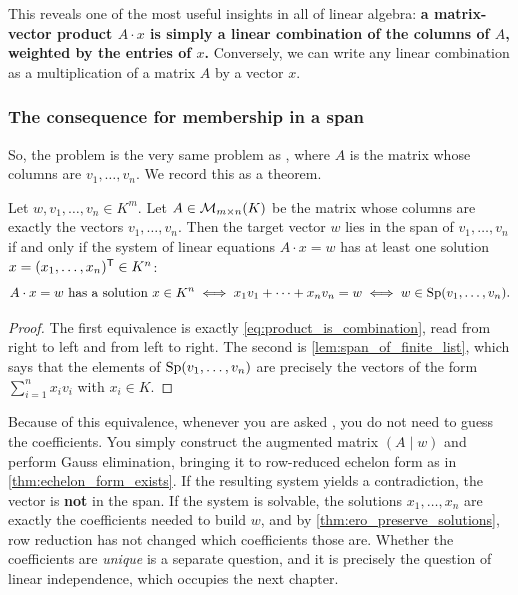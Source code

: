 This reveals one of the most useful insights in all of linear algebra: \textbf{a matrix-vector product $A \cdot x$ is simply a linear combination of the columns of $A$, weighted by the entries of $x$.} Conversely, we can write any linear combination as a multiplication of a matrix $A$ by a vector $x$.

\subsubsection{The consequence for membership in a span}

So, the problem  is the very same problem as , where $A$ is the matrix whose columns are $v_1, \dots, v_n$. We record this as a theorem.

\begin{theorem}
\label{thm:span_iff_consistent}
Let $w, v_1, \dots, v_n \in K^m$. Let $A \in \mathcal{M}_{m \times n}(K)$ be the matrix whose columns are exactly the vectors $v_1, \dots, v_n$. Then the target vector $w$ lies in the span of $v_1, \dots, v_n$ if and only if the system of linear equations $A \cdot x = w$ has at least one solution $x = (x_1, \dots, x_n)^{\mathsf{T}} \in K^n$:
\[
A \cdot x = w \text{ has a solution } x \in K^n
\iff x_1 v_1 + \dots + x_n v_n = w
\iff w \in \operatorname{Sp}(v_1, \dots, v_n).
\]
\end{theorem}

\begin{proof}
The first equivalence is exactly \eqref{eq:product_is_combination}, read from right to left and from left to right. The second is \cref{lem:span_of_finite_list}, which says that the elements of $\operatorname{Sp}(v_1, \dots, v_n)$ are precisely the vectors of the form $\sum_{i=1}^n x_i v_i$ with $x_i \in K$.
\end{proof}

\begin{remark}
\label{rem:span_check_in_practice}
Because of this equivalence, whenever you are asked , you do not need to guess the coefficients. You simply construct the augmented matrix $(A \mid w)$ and perform Gauss elimination, bringing it to row-reduced echelon form as in \cref{thm:echelon_form_exists}. If the resulting system yields a contradiction, the vector is \textbf{not} in the span. If the system is solvable, the solutions $x_1, \dots, x_n$ are exactly the coefficients needed to build $w$, and by \cref{thm:ero_preserve_solutions}, row reduction has not changed which coefficients those are. Whether the coefficients are \emph{unique} is a separate question, and it is precisely the question of linear independence, which occupies the next chapter.
\end{remark}

